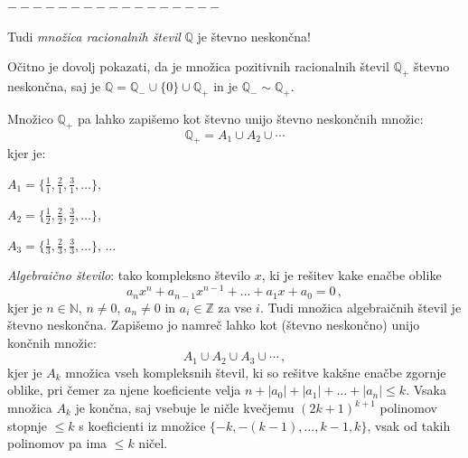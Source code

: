 \documentclass[11pt,paper=b5,footinclude,headinclude]{scrbook} %
\begin{document}
\bigskip
$-----------------$
\bigskip

Tudi {\em množica racionalnih števil} $\mathbb{Q}$ je števno neskončna!

Očitno je dovolj pokazati, da je množica pozitivnih racionalnih števil $\mathbb{Q}_+$
 števno neskončna, saj je $\mathbb{Q} = \mathbb{Q}_-\cup \{0\}\cup \mathbb{Q}_+$ in je
$\mathbb{Q}_-\sim \mathbb{Q}_+$.

Množico $\mathbb{Q}_+$ pa lahko zapišemo kot števno unijo števno neskončnih množic:
$$\mathbb{Q}_+ = A_1\cup A_2\cup \cdots$$
kjer je:

$A_1 = \{\frac{1}{1}, \frac{2}{1}, \frac{3}{1}, \ldots\}$,

$A_2 = \{\frac{1}{2}, \frac{2}{2}, \frac{3}{2}, \ldots\}$,

$A_3 = \{\frac{1}{3}, \frac{2}{3}, \frac{3}{3}, \ldots\}$, $\ldots$


{\em Algebraično število}: tako kompleksno število $x$, ki je rešitev kake enačbe oblike
$$a_nx^n+a_{n-1}x^{n-1}+\ldots+a_1x+a_0 = 0\,,$$
kjer je $n\in \mathbb{N}$, $n\neq 0$, $a_n\neq 0$ in $a_i\in \mathbb{Z}$ za vse $i$.
Tudi množica algebraičnih števil je števno neskončna. Zapišemo jo namreč lahko kot
(števno neskončno) unijo končnih množic:
$$A_1\cup A_2\cup A_3\cup \cdots\,,$$
kjer je $A_k$ množica vseh kompleksnih števil, ki so rešitve
kakšne enačbe zgornje oblike, pri čemer za njene koeficiente velja
$n+|a_0|+|a_1|+\ldots+|a_n|\le k$.
Vsaka množica $A_k$ je končna, saj vsebuje le ničle kvečjemu
$(2k+1)^{k+1}$ polinomov stopnje $\le k$ s koeficienti iz množice $\{-k,-(k-1), \ldots, k-1,k\}$, vsak od takih polinomov pa ima
$\le k$ ničel.



%
%
\end{document}
